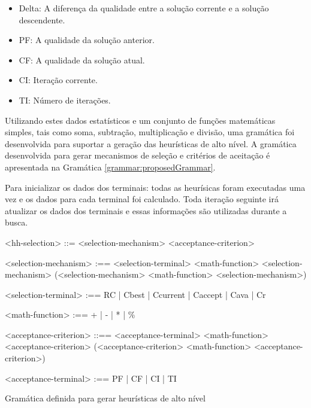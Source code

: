 \begin{itemize}
	\item Delta: A diferença da qualidade entre a solução corrente e a solução descendente.
	\item PF: A qualidade da solução anterior.
	\item CF: A qualidade da solução atual.
	\item CI: Iteração corrente.
	\item TI: Número de iterações.
\end{itemize}


Utilizando estes dados estatísticos e um conjunto de funções matemáticas simples, tais como soma, subtração, multiplicação e divisão, uma gramática foi desenvolvida para suportar a geração das heurísticas de alto nível. A gramática desenvolvida para gerar mecanismos de seleção e critérios de aceitação é apresentada na Gramática \ref{grammar:proposedGrammar}. 

Para inicializar os dados dos terminais: todas as heurísicas foram executadas uma vez e os dados para cada terminal foi calculado. Toda iteração seguinte irá atualizar os dados dos terminais e essas informações são utilizadas durante a busca.

 \begin{Grammar}
 	\begin{grammar}
 		<hh-selection> ::= <selection-mechanism> <acceptance-criterion> 
 		
 		<selection-mechanism> :==  <selection-terminal>   
 		\alt <selection-mechanism> <math-function> <selection-mechanism> 
 		\alt (<selection-mechanism> <math-function> <selection-mechanism>) 
 		
 		<selection-terminal> :== 
 		RC 
 		| Cbest 
 		| Ccurrent 
 		| Caccept 
 		| Cava 
 		| Cr
 		
 		<math-function> :== + 
 		| - 
 		| * 
 		| \%
 		
 		<acceptance-criterion> ::== <acceptance-terminal> 
 		\alt <acceptance-criterion> <math-function>
 		<acceptance-criterion>
 		\alt (<acceptance-criterion>  <math-function> <acceptance-criterion>) 
 		
 		<acceptance-terminal> :== PF | CF | CI | TI
 		
 		
 		
 	\end{grammar}
 	\caption{Gramática definida para gerar  heurísticas de alto nível}
 	\label{grammar:proposedGrammar}
 \end{Grammar}
 
